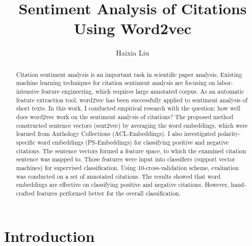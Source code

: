 \documentclass[11pt]{llncs}
\begin{document}
%
\mainmatter              %
%
\title{Sentiment Analysis of Citations Using Word2vec}
%
%
\author{Haixia Liu}

\maketitle              %

\begin{abstract}        %
Citation sentiment analysis is an important task in scientific paper analysis. Existing machine learning techniques for citation sentiment analysis are focusing on labor-intensive feature engineering, which requires large annotated corpus. As an automatic feature extraction tool, word2vec has been successfully applied to sentiment analysis of short texts. In this work, I conducted empirical research with the question: how well does word2vec work on the sentiment analysis of citations? The  proposed method constructed sentence vectors (sent2vec) by averaging the word embeddings, which were learned from Anthology Collections (ACL-Embeddings). I also investigated polarity-specific word embeddings (PS-Embeddings) for classifying positive and negative citations. The sentence vectors formed a feature space, to which the examined citation sentence was mapped to. Those features were input into classifiers (support vector machines) for supervised classification. Using 10-cross-validation scheme, evaluation was conducted on a set of annotated citations. The results showed that word embeddings are effective on classifying positive and negative citations. However, hand-crafted features performed better for the overall classification. 
\end{abstract}
\section{Introduction}
\end{document}
